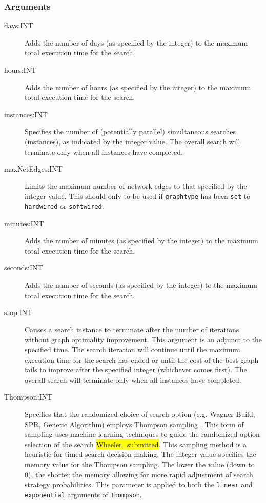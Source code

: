	\subsubsection{Arguments}
	\begin{description}
		\item[days:INT] Adds the number of days (as specified by the integer) to the 
		maximum total execution time for the search.
		
		\item[hours:INT] Adds the number of hours (as specified by the integer) to the 
		maximum total execution time for the search.
		
		\item[instances:INT] Specifies the number of (potentially parallel) simultaneous
		searches (instances), as indicated by the integer value. The overall search will 
		terminate only when all instances have completed.
		
		\item[maxNetEdges:INT] Limits the maximum number of network edges to that
		specified by the integer value. This should only to be used if \texttt{graphtype}
		has been \texttt{set} to \texttt{hardwired} or \texttt{softwired}. 
		
		\item[minutes:INT] Adds the number of minutes (as specified by the integer) to 
		the maximum total execution time for the search.
		
		\item[seconds:INT] Adds the number of seconds (as specified by the integer) to the 
		maximum total execution time for the search.

		\item[stop:INT] Causes a search instance to terminate after the number of iterations 
		without graph optimality improvement. This argument is an adjunct to the specified 
		time. The search iteration will continue until the maximum execution time for the search 
		has ended or until the cost of the best graph fails to improve after the specified integer 
		(whichever comes first). The overall search will terminate only when all instances have 
		completed.
		
		\item[Thompson:INT] Specifies that the randomized choice of search option (e.g. 
		Wagner Build, SPR, Genetic Algorithm) employs Thompson sampling \citep{Thompson1933}. 
		This form of sampling uses machine learning techniques to guide the randomized option selection 
		of the search \hl{Wheeler\_submitted}. This sampling method is a heuristic for timed search 
		decision making. The integer value specifies the memory value for the Thompson sampling.
		The lower the value (down to 0), the shorter the memory allowing for more rapid adjustment 
		of search strategy probabilities. This parameter is applied to both the \texttt{linear} and 
		\texttt{exponential} arguments of \texttt{Thompson}.
			

\end{description}
